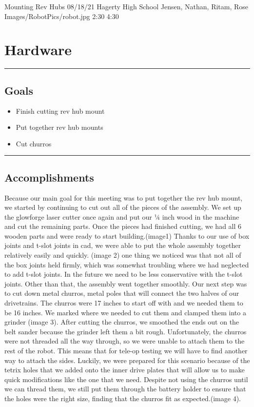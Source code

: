 \insertmeeting 
	{Mounting Rev Hubs} 
	{08/18/21}
	{Hagerty High School}
	{Jensen, Nathan, Ritam, Rose}
	{Images/RobotPics/robot.jpg}
	{2:30}
  {4:30}
	
\section*{Hardware}
\noindent\hfil\rule{\textwidth}{.4pt}\hfil
\subsection*{Goals}
\begin{itemize}
    \item Finish cutting rev hub mount
	\item Put together rev hub mounts
	\item Cut churros
  

\end{itemize} 

\noindent\hfil\rule{\textwidth}{.4pt}\hfil

\subsection*{Accomplishments}
Because our main goal for this meeting was to put together the rev hub mount, we started by continuing to cut out all of the pieces of the assembly. We set up the glowforge laser cutter once again and put our ¼ inch wood in the machine and cut the remaining parts. Once the pieces had finished cutting, we had all 6 wooden parts and were ready to start building.(image1)
Thanks to our use of box joints and t-slot joints in cad, we were able to put the whole assembly together relatively easily and quickly. (image 2) one thing we noticed was that not all of the box joints held firmly, which was somewhat troubling where we had neglected to add t-slot joints. In the future we need to be less conservative with the t-slot joints. Other than that, the assembly went together smoothly. 
Our next step was to cut down metal churros, metal poles that will connect the two halves of our drivetrains. The churros were 17 inches to start off with and we needed them to be 16 inches. We marked where we needed to cut them and clamped them into a grinder (image 3). After cutting the churros, we smoothed the ends out on the belt sander because the grinder left them a bit rough. Unfortunately, the churros were not threaded all the way through, so we were unable to attach them to the rest of the robot. This means that for tele-op testing we will have to find another way to attach the sides. Luckily, we were prepared for this scenario because of the tetrix holes that we added onto the inner drive plates that will allow us to make quick modifications like the one that we need. Despite not using the churros until we can thread them, we still put them through the battery holder to ensure that the holes were the right size, finding that the churros fit as expected.(image 4). 

